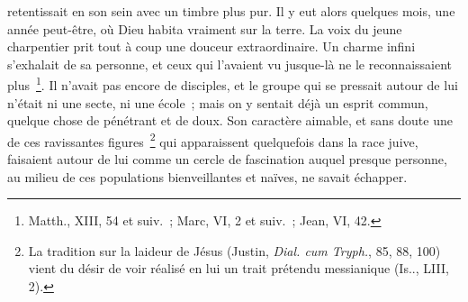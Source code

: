 \documentclass[french,twoside]{book} %
\begin{document}
retentissait en son sein avec un timbre plus pur. Il y eut alors quelques mois, une année peut-être, où Dieu habita vraiment sur la terre. La voix du jeune charpentier prit tout à coup une douceur extraordinaire. Un charme infini s’exhalait de sa personne, et ceux qui l’avaient vu jusque-là ne le reconnaissaient plus \footnote{Matth., XIII, 54 et suiv. ; Marc, VI, 2 et suiv. ; Jean, VI, 42.}. Il n’avait pas encore de disciples, et le groupe qui se pressait autour de lui n’était ni une secte, ni une école ; mais on y sentait déjà un esprit commun, quelque chose de pénétrant et de doux. Son caractère aimable, et sans doute une de ces ravissantes figures \footnote{ La tradition sur la laideur de Jésus (Justin, {\itshape Dial. cum Tryph.}, 85, 88, 100) vient du désir de voir réalisé en lui un trait prétendu messianique (Is.., LIII, 2).} qui apparaissent quelquefois dans la race juive, faisaient autour de lui comme un cercle de fascination auquel presque personne, au milieu de ces populations bienveillantes et naïves, ne savait échapper.\par
\end{document}
